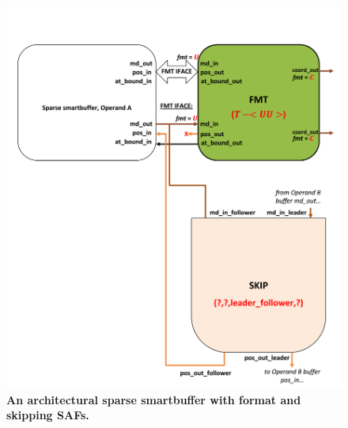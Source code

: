 \begin{figure}[ht]
\includegraphics[width=\textwidth]{figures/safinference_build_02fmtporttype.png}
\caption{\textbf{An architectural sparse smartbuffer with format and skipping SAFs.}}
\label{fig:safinference_build_02fmtporttype}
\centering
\end{figure}



